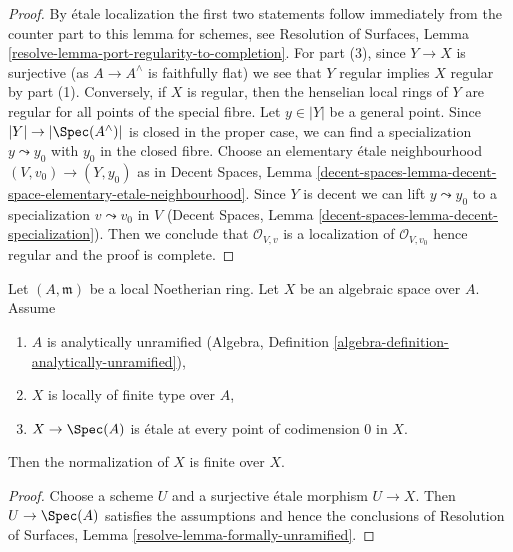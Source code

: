 \begin{proof}
By \'etale localization the first two statements follow
immediately from the counter part to this lemma for schemes, see
Resolution of Surfaces, Lemma \ref{resolve-lemma-port-regularity-to-completion}.
For part (3), since $Y \to X$ is surjective (as $A \to A^\wedge$
is faithfully flat) we see that $Y$ regular implies $X$ regular
by part (1). Conversely, if $X$ is regular, then the henselian
local rings of $Y$ are regular for all points of the special fibre.
Let $y \in |Y|$ be a general point.
Since $|Y| \to |\Spec(A^\wedge)|$ is closed in the proper
case, we can find a specialization $y \leadsto y_0$ with
$y_0$ in the closed fibre. Choose an elementary \'etale
neighbourhood $(V, v_0) \to (Y, y_0)$ as in
Decent Spaces, Lemma
\ref{decent-spaces-lemma-decent-space-elementary-etale-neighbourhood}.
Since $Y$ is decent we can lift $y \leadsto y_0$ to a specialization
$v \leadsto v_0$ in $V$
(Decent Spaces, Lemma \ref{decent-spaces-lemma-decent-specialization}).
Then we conclude that
$\mathcal{O}_{V, v}$ is a localization of $\mathcal{O}_{V, v_0}$
hence regular and the proof is complete.
\end{proof}

\begin{lemma}
\label{lemma-formally-unramified}
Let $(A, \mathfrak m)$ be a local Noetherian ring. Let
$X$ be an algebraic space over $A$. Assume
\begin{enumerate}
\item $A$ is analytically unramified
(Algebra, Definition \ref{algebra-definition-analytically-unramified}),
\item $X$ is locally of finite type over $A$,
\item $X \to \Spec(A)$ is \'etale at every point of codimension $0$ in $X$.
\end{enumerate}
Then the normalization of $X$ is finite over $X$.
\end{lemma}

\begin{proof}
Choose a scheme $U$ and a surjective \'etale morphism $U \to X$.
Then $U \to \Spec(A)$ satisfies the assumptions and hence the
conclusions of
Resolution of Surfaces, Lemma \ref{resolve-lemma-formally-unramified}.
\end{proof}











